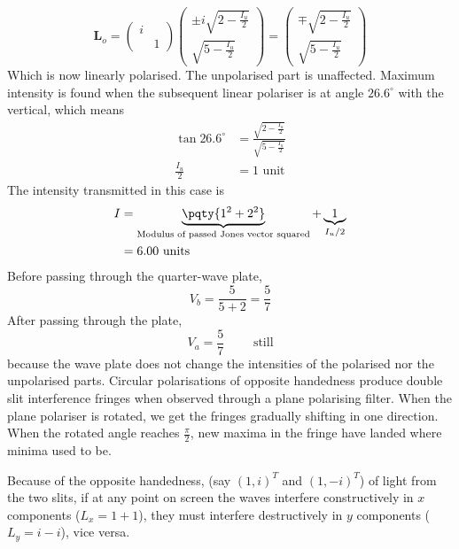 \documentclass[12pt]{extarticle}
\renewcommand{\bf}{\mathbf}
\begin{document}
\begin{outline}[enumerate]
        \[
            \bf L_o = \begin{pmatrix} i\\ &1 \end{pmatrix} \begin{pmatrix} \pm i\sqrt{2 - \frac{I_u}{2}}\\ \sqrt{5 - \frac{I_u}{2}} \end{pmatrix}  = \begin{pmatrix} \mp \sqrt{2 - \frac{I_u}{2}}\\ \sqrt{5 - \frac{I_u}{2}} \end{pmatrix}
        \]
        Which is now linearly polarised. The unpolarised part is unaffected. Maximum intensity is found when the subsequent linear polariser is at angle \(26.6^\circ\) with the vertical, which means
        \begin{align*}
            \tan{26.6^\circ} &=  \frac{\sqrt{2 - \frac{I_u}{2}}}{\sqrt{5 - \frac{I_u}{2}}} \\
            \frac{I_u}{2}&= 1 \text{ unit}
        \end{align*}
        The intensity transmitted in this case is \begin{align*}
            I &=  \underbrace{\pqty{1^2 + 2^2}}_\text{Modulus of passed Jones vector squared}+ \underbrace{1}_{I_u/2}\\
            &= 6.00 \text{ units}
        \end{align*}
        Before passing through the quarter-wave plate,
        \[
            V_b = \frac{5}{5 + 2} = \frac{5}{7}
        \]
        After passing through the plate,
        \[
            V_a = \frac{5}{7}\qquad  \text{ still}
        \]
        because the wave plate does not change the intensities of the polarised nor the unpolarised parts.
        \1 Circular polarisations of opposite handedness produce double slit interference fringes when observed through a plane polarising filter. When the plane polariser is rotated, we get the fringes gradually shifting in one direction. When the rotated angle reaches \(\frac{\pi}{2}\), new maxima in the fringe have landed where minima used to be.
        \begin{figure}[H]
            \centering
        \end{figure}
        Because of the opposite handedness, (say \((1,i)^T\) and \((1, - i)^T\)) of light from the two slits, if at any point on screen the waves interfere constructively in \(x\) components (\(L_x =1 + 1\)), they must interfere destructively in \(y\) components (\(L_y = i - i\)), vice versa.

\end{outline}
\end{document}
